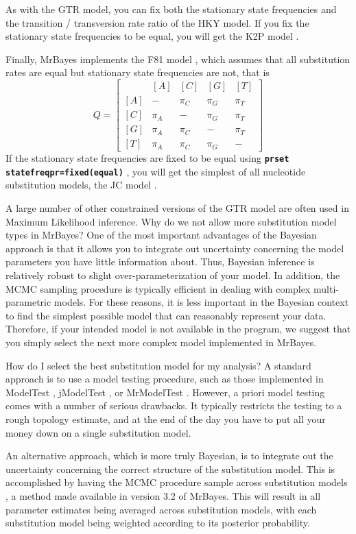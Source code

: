 \documentclass[12pt]{book}
\newcommand{\ttt}[1]{\texttt{#1} }
\newcommand{\tb}[1]{\ttt{\textbf{#1}} }
\begin{document}
As with the GTR model, you can fix both the stationary state frequencies and the transition /
transversion rate ratio of the HKY model. If you fix the stationary state frequencies to be equal,
you will get the K2P model \citep{kimura80}.

Finally, MrBayes implements the F81 model \citep{felsenstein81}, which assumes that all
substitution rates are equal but stationary state frequencies are not, that is
\[
Q=\begin{bmatrix}
    & [A] & [C] & [G] & [T] \\ 
 [A]& - & \pi_C & \pi_G & \pi_T\\ 
 [C]& \pi_A & - & \pi_G &\pi_T \\ 
 [G]& \pi_A & \pi_C& - & \pi_T\\ 
 [T]& \pi_A & \pi_C&\pi_G  & -
\end{bmatrix}
\]
If the stationary state frequencies are fixed to be equal using \tb{prset
statefreqpr=fixed(equal)}, you will get the simplest of all nucleotide substitution models, the
JC model \citep{jukes69}.

A large number of other constrained versions of the GTR model are often used in Maximum Likelihood
inference. Why do we not allow more substitution model types in MrBayes?  One of the most important
advantages of the Bayesian approach is that it allows you to integrate out uncertainty concerning
the model parameters you have little information about. Thus, Bayesian inference is relatively
robust to slight over-parameterization of your model. In addition, the MCMC sampling procedure is
typically efficient in dealing with complex multi-parametric models. For these reasons, it is less
important in the Bayesian context to find the simplest possible model that can reasonably represent
your data. Therefore, if your intended model is not available in the program, we suggest that you
simply select the next more complex model implemented in MrBayes.

How do I select the best substitution model for my analysis? A standard approach is to use a model
testing procedure, such as those implemented in ModelTest \citep{posada98}, jModelTest
\citep{posada08}, or MrModelTest \citep{}. However, a priori model testing comes with a number of
serious drawbacks. It typically restricts the testing to a rough topology estimate, and at the end
of the day you have to put all your money down on a single substitution model.

An alternative approach, which is more truly Bayesian, is to integrate out the uncertainty
concerning the correct structure of the substitution model. This is accomplished by having the MCMC
procedure sample across substitution models \citep{huelsenbeck04d}, a method made available in
version 3.2 of MrBayes. This will result in all parameter estimates being averaged across
substitution models, with each substitution model being weighted according to its posterior
probability.
\end{document}
